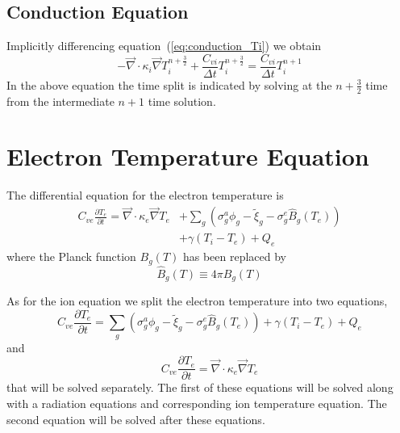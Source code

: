 \documentclass{article}
\newcommand{\partl}[2]{\ensuremath{\frac{\partial{#1}}{\partial{#2}}}}\newcommand{\del}{\ensuremath{\vec{\nabla}}}
\newcommand{\Bg}{\ensuremath{\hat{B}_{g}}}
\begin{document}
\subsection{Conduction Equation}

Implicitly differencing equation~(\ref{eq:conduction_Ti})
we obtain
\begin{equation}
  \boxed{
     - \del \cdot \kappa_{i} \del T^{n+\frac{3}{2}}_{i}
     + \frac{C_{vi}}{\Delta t} T^{n+\frac{3}{2}}_{i}
           = \frac{C_{vi}}{\Delta t} T^{n+1}_{i}
  }
\label{eq:conduction_Ti_tdiff}  
\end{equation}
In the above equation the time split is indicated by solving at the
$n+\frac{3}{2}$ time from the intermediate $n+1$ time solution.

\section{Electron Temperature Equation}

The differential equation for the electron temperature is
\begin{equation}
  \begin{split}
        C_{ve} \partl{T_{e}}{t} = 
                \del \cdot \kappa_{e} \del T_{e} & +
                \sum_{g} \left(
                        \sigma_{g}^{a} \phi_{g} - \tilde{\xi}_{g}
                        - \sigma_{g}^{e} \Bg(T_{e}) \right) \\
                        & + \gamma (T_{i} - T_{e}) + Q_{e}
  \end{split}
\end{equation}
where the Planck function $B_{g}(T)$ has been replaced by
\begin{equation}
        \Bg(T) \equiv 4\pi B_{g}(T)
\end{equation}

As for the ion equation we split the electron temperature into two
equations,
\begin{equation}
        C_{ve} \partl{T_{e}}{t} = 
                \sum_{g} \left(
                        \sigma_{g}^{a} \phi_{g} - \tilde{\xi}_{g}
                        - \sigma_{g}^{e} \Bg(T_{e}) \right)
                        + \gamma (T_{i} - T_{e}) + Q_{e}
\label{eq:couple_Te}
\end{equation}
and
\begin{equation}
        C_{ve} \partl{T_{e}}{t} = 
                \del \cdot \kappa_{e} \del T_{e}
\label{eq:conduction_Te}
\end{equation}
that will be solved separately.
The first of these equations will be solved along with a radiation
equations and corresponding
ion temperature equation.
The second equation will be solved after these equations.
\end{document}
